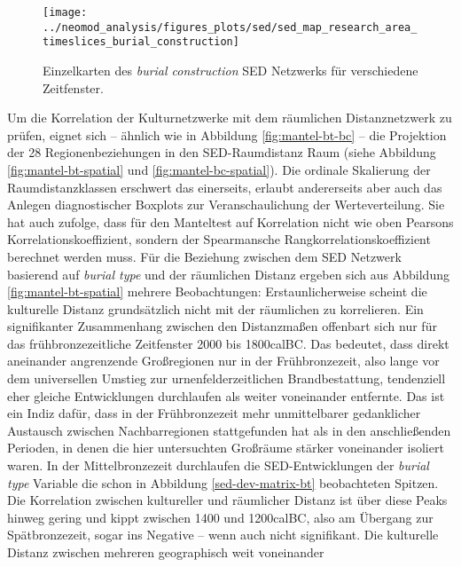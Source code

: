 \documentclass[openany,twoside,twocolumn]{book}
\begin{document}
\begin{landscape}
\begin{figure}
\texttt{[image: ../neomod\_analysis/figures\_plots/sed/sed\_map\_research\_area\_timeslices\_burial\_construction]} \caption[Einzelkarten des \textit{burial construction} SED Netzwerks für verschiedene Zeitfenster]{Einzelkarten des \textit{burial construction} SED Netzwerks für verschiedene Zeitfenster.}\label{fig:map-sed-bc}
\end{figure}
\end{landscape}

Um die Korrelation der Kulturnetzwerke mit dem räumlichen
Distanznetzwerk zu prüfen, eignet sich -- ähnlich wie in Abbildung
\ref{fig:mantel-bt-bc} -- die Projektion der 28 Regionenbeziehungen in
den SED-Raumdistanz Raum (siehe Abbildung \ref{fig:mantel-bt-spatial}
und \ref{fig:mantel-bc-spatial}). Die ordinale Skalierung der
Raumdistanzklassen erschwert das einerseits, erlaubt andererseits aber
auch das Anlegen diagnostischer Boxplots zur Veranschaulichung der
Werteverteilung. Sie hat auch zufolge, dass für den Manteltest auf
Korrelation nicht wie oben Pearsons Korrelationskoeffizient, sondern der
Spearmansche Rangkorrelationskoeffizient berechnet werden muss. Für die
Beziehung zwischen dem SED Netzwerk basierend auf \emph{burial type} und
der räumlichen Distanz ergeben sich aus Abbildung
\ref{fig:mantel-bt-spatial} mehrere Beobachtungen: Erstaunlicherweise
scheint die kulturelle Distanz grundsätzlich nicht mit der räumlichen zu
korrelieren. Ein signifikanter Zusammenhang zwischen den Distanzmaßen
offenbart sich nur für das frühbronzezeitliche Zeitfenster 2000 bis
1800calBC. Das bedeutet, dass direkt aneinander angrenzende Großregionen
nur in der Frühbronzezeit, also lange vor dem universellen Umstieg zur
urnenfelderzeitlichen Brandbestattung, tendenziell eher gleiche
Entwicklungen durchlaufen als weiter voneinander entfernte. Das ist ein
Indiz dafür, dass in der Frühbronzezeit mehr unmittelbarer gedanklicher
Austausch zwischen Nachbarregionen stattgefunden hat als in den
anschließenden Perioden, in denen die hier untersuchten Großräume
stärker voneinander isoliert waren. In der Mittelbronzezeit durchlaufen
die SED-Entwicklungen der \emph{burial type} Variable die schon in
Abbildung \ref{sed-dev-matrix-bt} beobachteten Spitzen. Die Korrelation
zwischen kultureller und räumlicher Distanz ist über diese Peaks hinweg
gering und kippt zwischen 1400 und 1200calBC, also am Übergang zur
Spätbronzezeit, sogar ins Negative -- wenn auch nicht signifikant. Die
kulturelle Distanz zwischen mehreren geographisch weit voneinander
\end{document}
